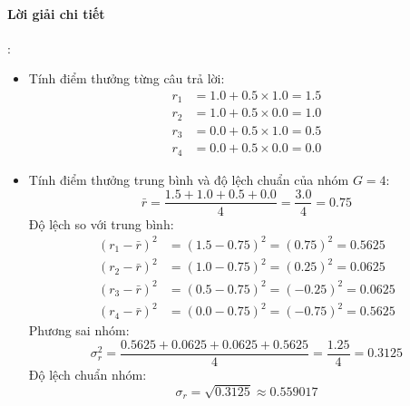 \paragraph{Lời giải chi tiết}:
\begin{itemize}
  \item[1)] Tính điểm thưởng từng câu trả lời:
  \begin{align*}
  r_1 &= 1.0 + 0.5 \times 1.0 = 1.5 \\
  r_2 &= 1.0 + 0.5 \times 0.0 = 1.0 \\
  r_3 &= 0.0 + 0.5 \times 1.0 = 0.5 \\
  r_4 &= 0.0 + 0.5 \times 0.0 = 0.0
  \end{align*}

  \item[2)] Tính điểm thưởng trung bình và độ lệch chuẩn của nhóm $G=4$:
  \begin{equation*}
  \bar{r} = \frac{1.5 + 1.0 + 0.5 + 0.0}{4} = \frac{3.0}{4} = 0.75
  \end{equation*}
  Độ lệch so với trung bình:
  \begin{align*}
  (r_1 - \bar{r})^2 &= (1.5 - 0.75)^2 = (0.75)^2 = 0.5625 \\
  (r_2 - \bar{r})^2 &= (1.0 - 0.75)^2 = (0.25)^2 = 0.0625 \\
  (r_3 - \bar{r})^2 &= (0.5 - 0.75)^2 = (-0.25)^2 = 0.0625 \\
  (r_4 - \bar{r})^2 &= (0.0 - 0.75)^2 = (-0.75)^2 = 0.5625
  \end{align*}
  Phương sai nhóm:
  \begin{equation*}
  \sigma_r^2 = \frac{0.5625 + 0.0625 + 0.0625 + 0.5625}{4} = \frac{1.25}{4} = 0.3125
  \end{equation*}
  Độ lệch chuẩn nhóm:
  \begin{equation*}
  \sigma_r = \sqrt{0.3125} \approx 0.559017
  \end{equation*}


\end{itemize}
